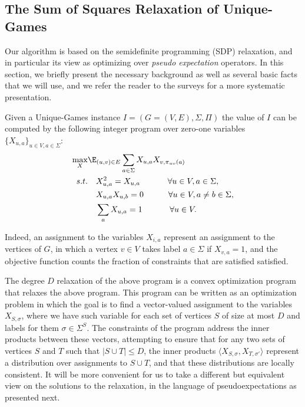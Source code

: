 
\subsection{The Sum of Squares Relaxation of Unique-Games}
Our algorithm is based on the \sos semidefinite programming (SDP) relaxation, and in particular its view as optimizing over \emph{pseudo expectation} operators. In this section, we 
briefly present the necessary background as well as several 
basic facts that we will use, and we refer the reader to the
surveys \cite{BarakS14,RaghavendraSS18,TCS-086} for a more 
systematic presentation.

Given a Unique-Games instance $I= (G=(V,E),\Sigma,\Pi)$
the value of $I$ can be computed by the following integer program over zero-one variables $\{ X_{u,a} \}_{u \in V, a \in \Sigma}$:
\begin{align}
\max_{X}& \E_{(u,v) \in E} \sum_{a \in \Sigma} X_{u,a} X_{v,\pi_{uv}(a)} \label{eq:ip}\\
s.t. 
&\quad X_{u,a}^2 = X_{u,a} ~\qquad\quad \forall u \in V, a \in \Sigma \nonumber,\\
&\quad X_{u,a}X_{u,b} = 0 \qquad\quad \forall u \in V, a \neq b \in \Sigma \nonumber,\\
&\quad \sum_{a} X_{u,a} = 1 ~\qquad\quad \forall u \in V\nonumber.
\end{align}

Indeed, an assignment to the variables $X_{i,a}$ represent 
an assignment to the vertices of $G$, in which a vertex $v \in V$ takes label $a \in \Sigma$ if $X_{v,a} = 1$, and the objective function counts the fraction of constraints 
that are satisfied satisfied.


The degree $D$ \sos relaxation of the above program is a convex 
optimization program that relaxes the above program. This 
program can be written as an optimization problem in which 
the goal is to find a vector-valued assignment to the variables $X_{S,\sigma}$, 
where we have such variable for each set of vertices $S$ of size at most $D$ and labels for them $\sigma\in \Sigma^S$. 
The constraints of the program address the inner products between these vectors, attempting to ensure that for any two sets 
of vertices $S$ and $T$ such that $|S\cup T|\leq D$, 
the inner products 
$\langle X_{S,\sigma}, X_{T,\sigma'}\rangle$ represent 
a distribution over assignments to $S\cup T$, and that 
these distributions are locally consistent. 
It will be more convenient for us to take a different 
but equivalent view on the solutions to the \sos relaxation,
in the language of pseudoexpectations as presented next.


